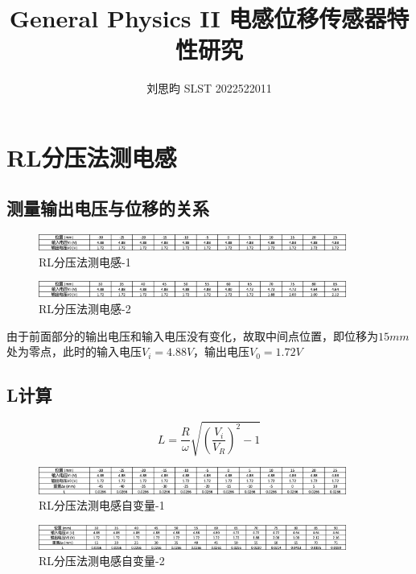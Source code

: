 \documentclass{article}
\author{刘思昀 SLST 2022522011}
\title{General Physics II 电感位移传感器特性研究}
\begin{document}
\date{}

\maketitle

\section{RL分压法测电感}

\subsection{测量输出电压与位移的关系}
\begin{figure}[htbp]
    \centering
    \includegraphics[width=0.9\textwidth]{RL-1.png}
    \caption{RL分压法测电感-1}
\end{figure}

\begin{figure}[htbp]
   \centering
   \includegraphics[width=0.9\textwidth]{RL-2.png}
   \caption{RL分压法测电感-2}
\end{figure}

由于前面部分的输出电压和输入电压没有变化，故取中间点位置，即位移为$15mm$处为零点，此时的输入电压$V_i = 4.88 V$，输出电压$V_0 = 1.72 V$

\subsection{L计算}
\begin{equation*}
   L = \frac{R}{\omega}\sqrt{(\frac{V_i}{V_R})^2 - 1}
\end{equation*}

\begin{figure}[htbp]
   \centering
   \includegraphics[width=0.9\textwidth]{RL-3.png}
   \caption{RL分压法测电感自变量-1}
\end{figure}

\begin{figure}[htbp]
  \centering
  \includegraphics[width=0.9\textwidth]{RL-4.png}
  \caption{RL分压法测电感自变量-2}
\end{figure}
\end{document}
